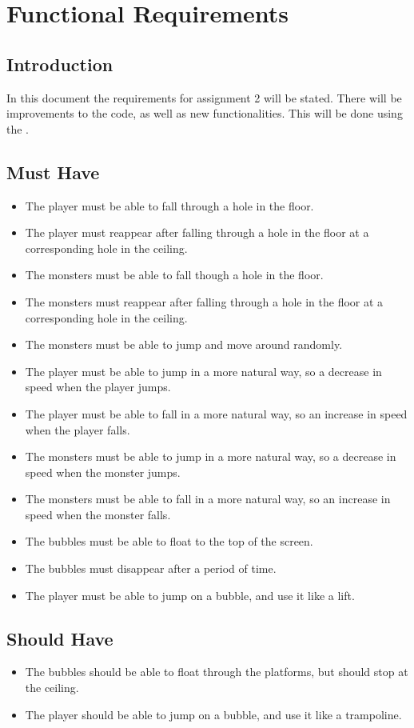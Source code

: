 \chapter{Functional Requirements}

\section{Introduction}
In this document the requirements for assignment 2 will be stated. There will be improvements to the code, as well as new functionalities. \noindent This will be done using the .

\section{Must Have}
\begin{itemize}
\itemsep0em
\item The player must be able to fall through a hole in the floor.
\item The player must reappear after falling through a hole in the floor at a corresponding hole in the ceiling.
\item The monsters must be able to fall though a hole in the floor.
\item The monsters must reappear after falling through a hole in the floor at a corresponding hole in the ceiling.
\item The monsters must be able to jump and move around randomly.
\item The player must be able to jump in a more natural way, so a decrease in speed when the player jumps.
\item The player must be able to fall in a more natural way, so an increase in speed when the player falls.
\item The monsters must be able to jump in a more natural way, so a decrease in speed when the monster jumps.
\item The monsters must be able to fall in a more natural way, so an increase in speed when the monster falls.
\item The bubbles must be able to float to the top of the screen.
\item The bubbles must disappear after a period of time.
\item The player must be able to jump on a bubble, and use it like a lift.
\end{itemize}

\section{Should Have}
\begin{itemize}
\itemsep0em
\item The bubbles should be able to float through the platforms, but should stop at the ceiling.
\item The player should be able to jump on a bubble, and use it like a trampoline.
\end{itemize}

